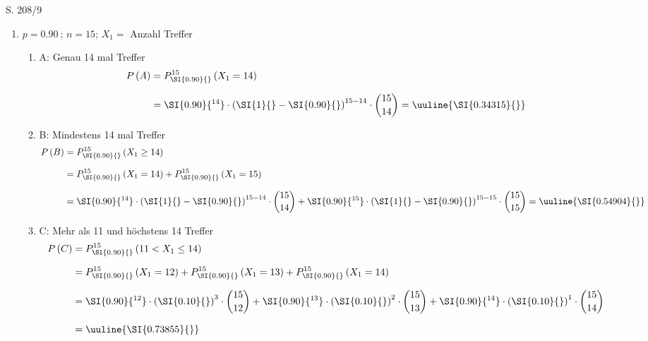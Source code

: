 \begin{Exercise}{S. 208/9}{}
\begin{enumerate}[leftmargin=*]
    \item [9.]{
        $p = \SI{0.90}{}$; \quad $n = 15$; \quad $X_{1} =$ Anzahl Treffer\\[-1.0ex]
        \begin{enumerate}[label=\alph*),leftmargin=*]
            \item[a)] {
                A: Genau 14 mal Treffer\\[-2.0ex]
                \begin{align*}
                    P\left(A\right) &= P_{\SI{0.90}{}}^{15}\left(X_{1} = 14\right)\\[1.5ex]
                    &= \SI{0.90}{^{14}} \cdot \left(\SI{1}{} - \SI{0.90}{}\right)^{15-14} \cdot \binom{15}{14} = \uuline{\SI{0.34315}{}}
                \end{align*}
                }
            \item[b)] {
                B: Mindestens 14 mal Treffer\\[-2.0ex]
                 \begin{align*}
                    P\left(B\right) &= P_{\SI{0.90}{}}^{15}\left(X_{1} \geq 14\right)\\[1.5ex]
                    &= P_{\SI{0.90}{}}^{15}\left(X_{1} = 14\right) + P_{\SI{0.90}{}}^{15}\left(X_{1} = 15\right)\\[1.5ex]
                    &= \SI{0.90}{^{14}} \cdot \left(\SI{1}{} - \SI{0.90}{}\right)^{15-14} \cdot \binom{15}{14} + \SI{0.90}{^{15}} \cdot \left(\SI{1}{} - \SI{0.90}{}\right)^{15-15} \cdot \binom{15}{15} = \uuline{\SI{0.54904}{}}
                \end{align*}
                }
            \item[c)] {
                C: Mehr als 11 und höchstens 14 Treffer\\[-2.0ex]
                 \begin{align*}
                    P\left(C\right) &= P_{\SI{0.90}{}}^{15}\left(11 < X_{1} \leq 14\right)\\[1.5ex]
                    &= P_{\SI{0.90}{}}^{15}\left(X_{1} = 12\right) + P_{\SI{0.90}{}}^{15}\left(X_{1} = 13\right) + P_{\SI{0.90}{}}^{15}\left(X_{1} = 14\right)\\[1.5ex]
                    &= \SI{0.90}{^{12}} \cdot \left(\SI{0.10}{}\right)^{3} \cdot \binom{15}{12} + \SI{0.90}{^{13}} \cdot \left(\SI{0.10}{}\right)^{2} \cdot \binom{15}{13} + \SI{0.90}{^{14}} \cdot \left(\SI{0.10}{}\right)^{1} \cdot \binom{15}{14}\\[1.5ex]
                    &= \uuline{\SI{0.73855}{}}
                \end{align*}
                }
        \end{enumerate}
    }
\end{enumerate}
\end{Exercise}
